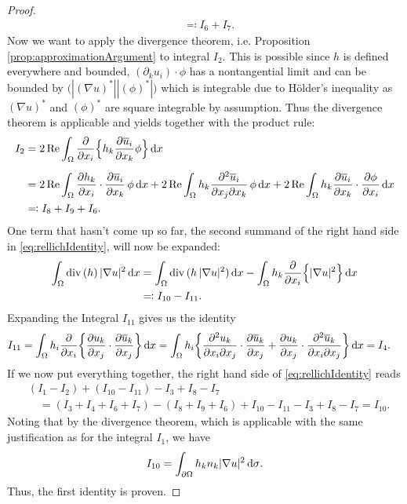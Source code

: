 \begin{proof}
\begin{align*}
     &\eqqcolon I_6 + I_7 .
  \end{align*}
  Now we want to apply the divergence theorem, i.e. Proposition \ref{prop:approximationArgument} to integral $I_2$.
  This is possible since $h$ is defined everywhere and bounded, $(\partial_k u_i) \cdot \phi$ has a nontangential limit and can be bounded by $\big( |(\nabla u)^*| |(\phi)^*| \big)$ which is integrable due to Hölder's inequality as $(\nabla u)^*$ and $(\phi)^*$ are square integrable by assumption.
  Thus the divergence theorem is applicable and yields together with the product rule:
  \begin{align*}
    I_2
    &= 2 \operatorname{Re} \int_\Omega \frac{\partial}{\partial x_i} \Big\{ h_k \frac{\partial \overline u_i}{\partial x_k} \phi \Big\} \, {\operatorname{d}\!{x}} \\[0.5em]
    &= 2 \operatorname{Re} \int_\Omega \frac{\partial h_k}{\partial x_i} \cdot \frac{\partial \overline u_i}{\partial x_k} \, \phi \, {\operatorname{d}\!{x}} + 2 \operatorname{Re} \int_\Omega h_k \frac{\partial^2 \overline u_i}{\partial x_j \partial x_k} \, \phi \, {\operatorname{d}\!{x}} + 2 \operatorname{Re} \int_\Omega h_k \frac{\partial \overline u_i}{\partial x_k} \cdot \frac{\partial \phi}{\partial x_i} \, {\operatorname{d}\!{x}}\\
    &\eqqcolon I_8 + I_9 + I_6.
  \end{align*}
  One term that hasn't come up so far, the second summand of the right hand side in \eqref{eq:rellichIdentity}, will now be expanded:
  \begin{align*}
    \int_\Omega \mathrm{div\,} (h)\,  |\nabla u|^2 \, {\operatorname{d}\!{x}}
    &= \int_\Omega \mathrm{div\,} ( h\,|\nabla u|^2) \, {\operatorname{d}\!{x}} - \int_\Omega h_k \frac{\partial}{\partial x_i} \Big\{ |\nabla u|^2 \Big\} \, {\operatorname{d}\!{x}} \\
    &\eqqcolon I_{10} - I_{11}.
  \end{align*}
  Expanding the Integral $I_{11}$ gives us the identity
  \begin{align*}
    I_{11}
    &= \int_\Omega h_i \frac{\partial}{\partial x_i} \bigg\{ \frac{\partial u_k}{\partial x_j} \cdot \frac{\partial \overline u_k}{\partial x_j} \bigg\} \, {\operatorname{d}\!{x}}
    = \int_\Omega h_i  \bigg\{ \frac{\partial^2 u_k}{\partial x_i \partial x_j} \cdot \frac{\partial \overline u_k}{\partial x_j} + \frac{\partial u_k}{\partial x_j} \cdot \frac{\partial^2 \overline u_k}{\partial x_i \partial x_j} \bigg\} \, {\operatorname{d}\!{x}}= I_4.
  \end{align*}
  If we now put everything together, the right hand side of \eqref{eq:rellichIdentity} reads
  \begin{align*}
    &(I_1 - I_2) + (I_{10} - I_{11}) - I_3 + I_8 - I_7 \\
    &\quad= (I_3 + I_4 + I_6 + I_7) - (I_8 + I_9 + I_6) + I_{10} - I_{11} - I_3 + I_8 - I_7 = I_{10}.
  \end{align*}
  Noting that by the divergence theorem, which is applicable with the same justification as for the integral $I_1$, we have
  \begin{align*}
    I_{10} = \int_{\partial\Omega} h_k n_k |\nabla u|^2 \, {\operatorname{d}\!{\sigma}}.
  \end{align*}
  Thus, the first identity is proven.


\end{proof}
